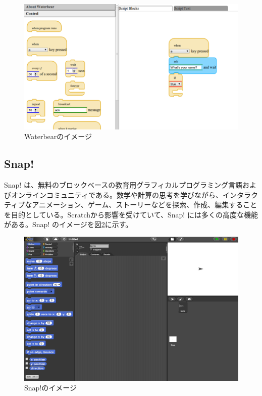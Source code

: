 \documentclass{risepaper}
\begin{document}
\begin{figure}[h]
\begin{center}
\includegraphics[scale=0.5]{img/waterbear.png}
\caption{Waterbearのイメージ}%
\label{fig:waterbear}
\end{center}%
\end{figure}%

	\subsection{Snap!}

Snap! は、無料のブロックベースの教育用グラフィカルプログラミング言語およびオンラインコミュニティである。数学や計算の思考を学びながら、インタラクティブなアニメーション、ゲーム、ストーリーなどを探索、作成、編集することを目的としている。Scratchから影響を受けていて、Snap! には多くの高度な機能がある。Snap! のイメージを図\ref{fig:snap}に示す。 

\begin{figure}[h]
\begin{center}
\includegraphics[scale=0.5]{img/snap.png}
\caption{Snap!のイメージ}%
\label{fig:snap}
\end{center}%
\end{figure}%
\end{document}
